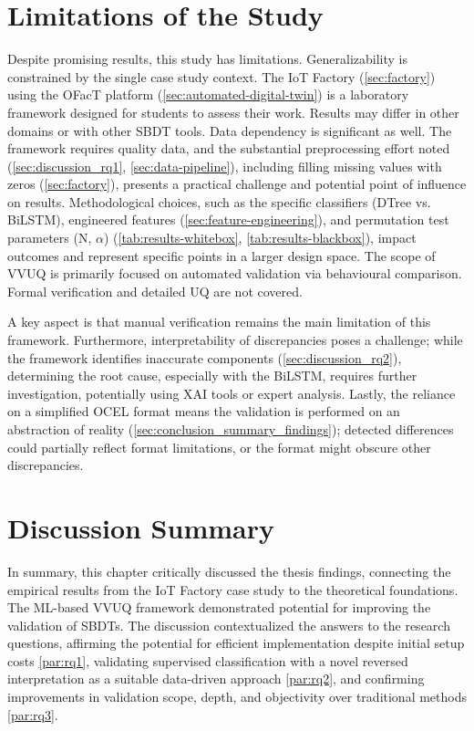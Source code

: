 \section{Limitations of the Study}
\label{sec:discussion_limitations}

Despite promising results, this study has limitations. Generalizability is constrained by the single case study context. The IoT Factory (\autoref{sec:factory}) using the OFacT platform (\autoref{sec:automated-digital-twin}) is a laboratory framework designed for students to assess their work. Results may differ in other domains or with other SBDT tools. Data dependency is significant as well. The framework requires quality data, and the substantial preprocessing effort noted (\autoref{sec:discussion_rq1}, \autoref{sec:data-pipeline}), including filling missing values with zeros (\autoref{sec:factory}), presents a practical challenge and potential point of influence on results. Methodological choices, such as the specific classifiers (DTree vs. BiLSTM), engineered features (\autoref{sec:feature-engineering}), and permutation test parameters (N, $\alpha$) (\autoref{tab:results-whitebox}, \autoref{tab:results-blackbox}), impact outcomes and represent specific points in a larger design space. The scope of VVUQ is primarily focused on automated validation via behavioural comparison. Formal verification and detailed UQ are not covered.

A key aspect is that manual verification remains the main limitation of this framework. Furthermore, interpretability of discrepancies poses a challenge; while the framework identifies inaccurate components (\autoref{sec:discussion_rq2}), determining the root cause, especially with the BiLSTM, requires further investigation, potentially using XAI tools or expert analysis. Lastly, the reliance on a simplified OCEL format means the validation is performed on an abstraction of reality (\autoref{sec:conclusion_summary_findings}); detected differences could partially reflect format limitations, or the format might obscure other discrepancies.

\section{Discussion Summary}
\label{sec:discussion_summary}

In summary, this chapter critically discussed the thesis findings, connecting the empirical results from the IoT Factory case study to the theoretical foundations. The ML-based VVUQ framework demonstrated potential for improving the validation of SBDTs. The discussion contextualized the answers to the research questions, affirming the potential for efficient implementation despite initial setup costs \autoref{par:rq1}, validating supervised classification with a novel reversed interpretation as a suitable data-driven approach \autoref{par:rq2}, and confirming improvements in validation scope, depth, and objectivity over traditional methods \autoref{par:rq3}.